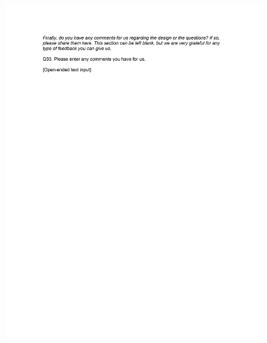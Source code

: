 \documentclass[12pt,econ]{sources/authesis}
\makeatletter
\def\maxwidth{\ifdim\Gin@nat@width>\linewidth\linewidth
\else\Gin@nat@width\fi}
\let\Oldincludegraphics\includegraphics
\renewcommand{\includegraphics}[1]{\Oldincludegraphics[width=\maxwidth]{#1}}
\makeatother
\begin{document}
\begin{figure}[hbt]
  \centering
\includegraphics{data/framing/appendix/questionnaire/questionnaire21.jpg}
\end{figure}
\end{document}
